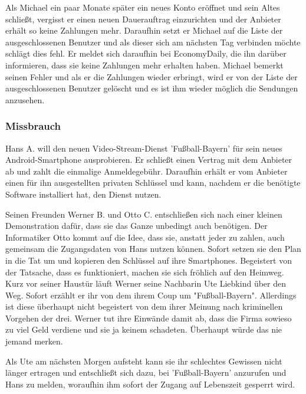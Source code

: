 \documentclass[a4paper,10pt]{scrartcl}
\begin{document}
Als Michael ein paar Monate später ein neues Konto eröffnet und sein Altes schließt, vergisst er einen neuen Dauerauftrag einzurichten und der Anbieter erhält so keine Zahlungen mehr. 
Daraufhin setzt er Michael auf die Liste der ausgeschlossenen Benutzer und als dieser sich am nächsten Tag verbinden möchte schlägt dies fehl. 
Er meldet sich daraufhin bei EconomyDaily, die ihn darüber informieren, dass sie keine Zahlungen mehr erhalten haben. 
Michael bemerkt seinen Fehler und als er die Zahlungen wieder erbringt, wird er von der Liste der ausgeschlossenen Benutzer gelöscht und es ist ihm wieder möglich die Sendungen anzusehen.

\subsubsection{Missbrauch}
Hans A. will den neuen Video-Stream-Dienst 'Fußball-Bayern' für sein neues Android-Smartphone ausprobieren. Er schließt einen Vertrag mit dem Anbieter ab und zahlt die einmalige Anmeldegebühr. Daraufhin erhält er vom Anbieter einen für ihn ausgestellten privaten Schlüssel und kann, nachdem er die benötigte Software installiert hat, den Dienst nutzen.

Seinen Freunden Werner B. und Otto C. entschließen sich nach einer kleinen Demonstration dafür, dass sie das Ganze unbedingt auch benötigen.
Der Informatiker Otto kommt auf die Idee, dass sie, anstatt jeder zu zahlen, auch gemeinsam die Zugangsdaten von Hans nutzen können.
Sofort setzen sie den Plan in die Tat um und kopieren den Schlüssel auf ihre Smartphones. Begeistert von der Tatsache, dass es funktioniert,
machen sie sich fröhlich auf den Heimweg. Kurz vor seiner Haustür läuft Werner seine Nachbarin Ute Liebkind über den Weg. Sofort erzählt
er ihr von dem ihrem Coup um "Fußball-Bayern". Allerdings ist diese überhaupt nicht begeistert von dem ihrer Meinung nach kriminellen
Vorgehen der drei. Werner tut ihre Einwände damit ab, dass die Firma sowieso zu viel Geld verdiene und sie ja keinem schadeten.
Überhaupt würde das nie jemand merken.

Als Ute am nächsten Morgen aufsteht kann sie ihr schlechtes Gewissen nicht länger ertragen und entschließt sich dazu, bei 'Fußball-Bayern' anzurufen und
Hans zu melden, woraufhin ihm sofort der Zugang auf Lebenszeit gesperrt wird.
\end{document}
